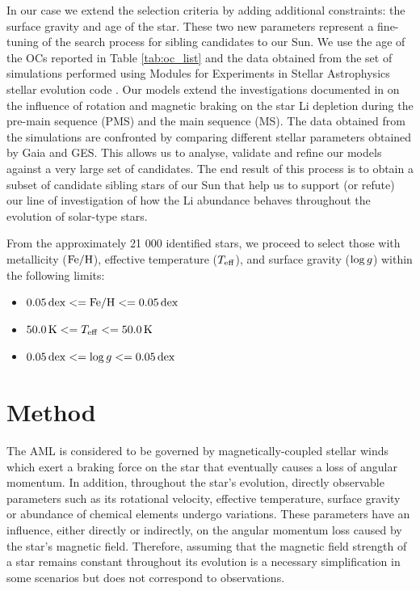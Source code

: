 \documentclass[fleqn,usenatbib]{mnras}
\begin{document}
In our case we extend the selection criteria by adding additional constraints: the surface gravity and age of the star. These two new parameters represent a fine-tuning of the search process for sibling candidates to our Sun. We use the age of the OCs reported in Table \ref{tab:oc_list} and the data obtained from the set of simulations performed using Modules for Experiments in Stellar Astrophysics stellar evolution code \citep[MESA; ][]{Paxton2011, Paxton2013,Paxton2015, Paxton2018, Paxton2019}. Our models extend the investigations documented in \cite{Navarro2020} on the influence of rotation and magnetic braking on the star Li depletion during the pre-main sequence (PMS) and the main sequence (MS). The data obtained from the simulations are confronted by comparing different stellar parameters obtained by Gaia and GES. This allows us to analyse, validate and refine our models against a very large set of candidates. The end result of this process is to obtain a subset of candidate sibling stars of our Sun that help us to support (or refute) our line of investigation of how the Li abundance behaves throughout the evolution of solar-type stars.\par

From the approximately 21 000 identified stars, we proceed to select those with metallicity ($\mathrm{Fe}/\mathrm{H}$), effective temperature ($T_{\mathrm{eff}}$), and surface gravity ($\mathrm{log} \, g$) within the following limits:
\begin{itemize}
    \item $0.05 \, \mathrm{dex} <= \mathrm{Fe}/\mathrm{H} <= 0.05 \, \mathrm{dex}$
    \item $50.0 \, \mathrm{K} <= T_{\mathrm{eff}} <= 50.0 \, \mathrm{K}$
    \item $0.05 \, \mathrm{dex} <= \mathrm{log} \, g <= 0.05 \, \mathrm{dex}$
\end{itemize}


\section{Method} \label{sec_method}
The AML is considered to be governed by magnetically-coupled stellar winds which exert a braking force on the star that eventually causes a loss of angular momentum. In addition, throughout the star's evolution, directly observable parameters such as its rotational velocity, effective temperature, surface gravity or abundance of chemical elements undergo variations. These parameters have an influence, either directly or indirectly, on the angular momentum loss caused by the star's magnetic field. Therefore, assuming that the magnetic field strength of a star remains constant throughout its evolution is a necessary simplification in some scenarios but does not correspond to observations.\par
\end{document}
